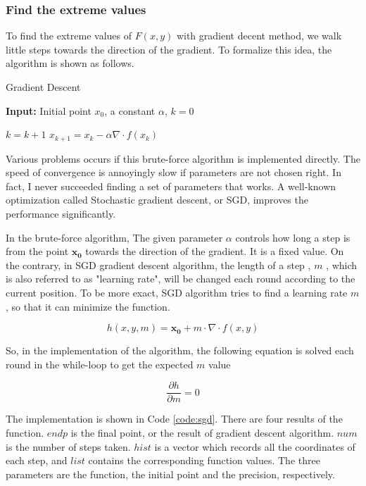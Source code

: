 \documentclass[12pt]{article}
\begin{document}
\subsubsection{Find the extreme values}
To find the extreme values of $F(x,y)$ with gradient decent method, we walk little steps towards the direction of the gradient. To formalize this idea, the algorithm is shown as follows.

\begin{algorithm}
	\caption{Gradient Descent}
	\hspace*{0.02in} {\bf Input:}
	Initial point $x_0$, a constant $\alpha$, $k=0$
	\begin{algorithmic}
	\State $k=k+1$
	\State $x_{k+1}=x_k-\alpha \nabla \cdot f(x_k)$
	
	\EndWhile
	\end{algorithmic}
\end{algorithm}

Various problems occurs if this brute-force algorithm is implemented directly. The speed of convergence is annoyingly slow if parameters are not chosen right. In fact, I never succeeded finding a set of parameters that works. A well-known optimization  called Stochastic gradient descent, or SGD, improves the performance significantly.

In the brute-force algorithm, The given parameter $\alpha$ controls how long a step is from the point $\mathbf{x_0}$ towards the direction of the gradient. It is a fixed value. On the contrary, in SGD gradient descent algorithm, the length of a step , $m$ , which is also referred to as "learning rate", will be changed each round according to the current position. To be more exact, SGD algorithm tries to find a learning rate $m$, so that it can minimize the function.

\begin{equation}
	h(x,y,m) = \mathbf{x_0} + m \cdot \nabla \cdot f(x,y)
\end{equation}

So, in the implementation of the algorithm, the following equation is solved each round in the while-loop to get the expected $m$ value

\begin{equation}
	\frac{\partial h}{\partial m} = 0
\end{equation}

The implementation is shown in Code \ref{code:sgd}. There are four results of the function. $endp$ is the final point, or the result of gradient descent algorithm. $num$ is the number of steps taken. $hist$ is a vector which records all the coordinates of each step, and $list$ contains the corresponding function values. The three parameters are the function, the initial point and the precision, respectively.
\end{document}
